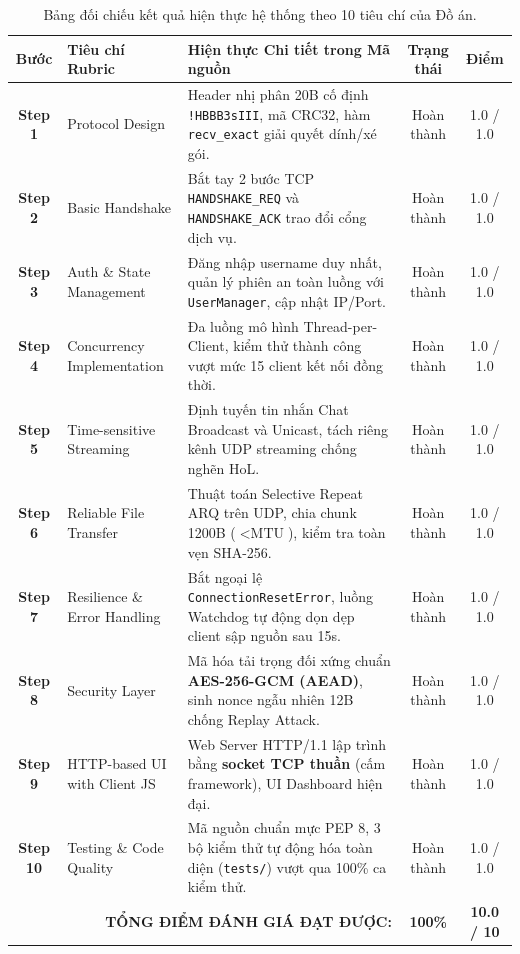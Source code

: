 \documentclass[11pt,a4paper]{article}
\begin{document}
\begin{table}[htbp]
\centering
\small
\begin{tabularx}{\textwidth}{cp{3.8cm}Xcc}
\toprule
\rowcolor{headergray}
\textbf{Bước} & \textbf{Tiêu chí Rubric} & \textbf{Hiện thực Chi tiết trong Mã nguồn} & \textbf{Trạng thái} & \textbf{Điểm} \\
\midrule
\textbf{Step 1} & Protocol Design & Header nhị phân 20B cố định \texttt{!HBBB3sIII}, mã CRC32, hàm \texttt{recv_exact} giải quyết dính/xé gói. & Hoàn thành & 1.0 / 1.0 \\
\textbf{Step 2} & Basic Handshake & Bắt tay 2 bước TCP \texttt{HANDSHAKE\_REQ} và \texttt{HANDSHAKE\_ACK} trao đổi cổng dịch vụ. & Hoàn thành & 1.0 / 1.0 \\
\textbf{Step 3} & Auth \& State Management & Đăng nhập username duy nhất, quản lý phiên an toàn luồng với \texttt{UserManager}, cập nhật IP/Port. & Hoàn thành & 1.0 / 1.0 \\
\textbf{Step 4} & Concurrency Implementation & Đa luồng mô hình Thread-per-Client, kiểm thử thành công vượt mức 15 client kết nối đồng thời. & Hoàn thành & 1.0 / 1.0 \\
\textbf{Step 5} & Time-sensitive Streaming & Định tuyến tin nhắn Chat Broadcast và Unicast, tách riêng kênh UDP streaming chống nghẽn HoL. & Hoàn thành & 1.0 / 1.0 \\
\textbf{Step 6} & Reliable File Transfer & Thuật toán Selective Repeat ARQ trên UDP, chia chunk 1200B ($< \text{MTU}$), kiểm tra toàn vẹn SHA-256. & Hoàn thành & 1.0 / 1.0 \\
\textbf{Step 7} & Resilience \& Error Handling & Bắt ngoại lệ \texttt{ConnectionResetError}, luồng Watchdog tự động dọn dẹp client sập nguồn sau 15s. & Hoàn thành & 1.0 / 1.0 \\
\textbf{Step 8} & Security Layer & Mã hóa tải trọng đối xứng chuẩn \textbf{AES-256-GCM (AEAD)}, sinh nonce ngẫu nhiên 12B chống Replay Attack. & Hoàn thành & 1.0 / 1.0 \\
\textbf{Step 9} & HTTP-based UI with Client JS & Web Server HTTP/1.1 lập trình bằng \textbf{socket TCP thuần} (cấm framework), UI Dashboard hiện đại. & Hoàn thành & 1.0 / 1.0 \\
\textbf{Step 10} & Testing \& Code Quality & Mã nguồn chuẩn mực PEP 8, 3 bộ kiểm thử tự động hóa toàn diện (\texttt{tests/}) vượt qua 100\% ca kiểm thử. & Hoàn thành & 1.0 / 1.0 \\
\midrule
\multicolumn{3}{r}{\textbf{TỔNG ĐIỂM ĐÁNH GIÁ ĐẠT ĐƯỢC:}} & \textbf{100\%} & \textbf{10.0 / 10} \\
\bottomrule
\end{tabularx}
\caption{Bảng đối chiếu kết quả hiện thực hệ thống theo 10 tiêu chí của Đồ án.}
\label{tab:rubric}
\end{table}
\end{document}
